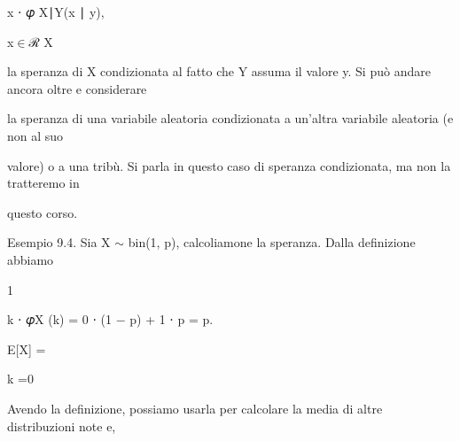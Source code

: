 \documentclass[a4paper,portrait,12pt]{article}
\begin{document}
\begin{flushleft}
x ⋅ 𝜑 X∣Y(x ∣ y),
\end{flushleft}


\begin{flushleft}
x$\in$ℛ X
\end{flushleft}





\begin{flushleft}
la speranza di X condizionata al fatto che Y assuma il valore y. Si pu\`{o} andare ancora oltre e considerare
\end{flushleft}


\begin{flushleft}
la speranza di una variabile aleatoria condizionata a un'altra variabile aleatoria (e non al suo
\end{flushleft}


\begin{flushleft}
valore) o a una tribù. Si parla in questo caso di speranza condizionata, ma non la tratteremo in
\end{flushleft}


\begin{flushleft}
questo corso.
\end{flushleft}


\begin{flushleft}
Esempio 9.4. Sia X $\sim$ bin(1, p), calcoliamone la speranza. Dalla definizione abbiamo
\end{flushleft}


1





\begin{flushleft}
k ⋅ 𝜑X (k) = 0 ⋅ (1 $-$ p) + 1 ⋅ p = p.
\end{flushleft}





\begin{flushleft}
E[X] =
\end{flushleft}


\begin{flushleft}
k =0
\end{flushleft}





\begin{flushleft}
Avendo la definizione, possiamo usarla per calcolare la media di altre distribuzioni note e,
\end{flushleft}
\end{document}
